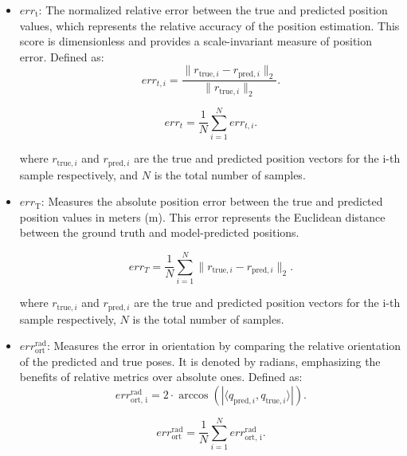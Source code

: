 \documentclass[a4paper,fleqn]{cas-sc}
\begin{document}
\begin{itemize}
	\item $err_{\text{t}}$: The normalized relative error between the true and predicted position values, which represents the relative accuracy of the position estimation. This score is dimensionless and provides a scale-invariant measure of position error. Defined as:
	\begin{equation}
		err_{t,i} = \frac{\| r_{\text{true},i} - r_{\text{pred},i} \|_2}{\| r_{\text{true},i} \|_2}.
	\end{equation}
	
	\begin{equation}
		err_t = \frac{1}{N} \sum\limits_{i=1}^{N} err_{t,i}.
	\end{equation}
	
	where $r_{\text{true},i}$ and $r_{\text{pred},i}$ are the true and predicted position vectors for the i-th sample respectively, and $N$ is the total number of samples.
	
	\item $err_{\text{T}}$: Measures the absolute position error between the true and predicted position values in meters (m). This error represents the Euclidean distance between the ground truth and model-predicted positions.
	
	\begin{equation}
		err_T = \frac{1}{N}\sum\limits_{i=1}^{N} \| r_{\text{true},i} - r_{\text{pred},i} \|_2.
	\end{equation}
	
	where $r_{\text{true},i}$ and $r_{\text{pred},i}$ are the true and predicted position vectors for the i-th sample respectively, $N$ is the total number of samples.
	
	\item $err_{\text{ort}}^{\text{rad}}$: Measures the error in orientation by comparing the relative orientation of the predicted and true poses.
	It is denoted by radians, emphasizing the benefits of relative metrics over absolute ones. Defined as:
	\begin{equation}
		err_{\text{ort, i}}^{\text{rad}} =  2 \cdot \arccos \left( \left| \langle q_{\text{pred},i}, q_{\text{true},i} \rangle \right| \right).
	\end{equation}
	
	\begin{equation}
		err_{\text{ort}}^{\text{rad}} = \frac{1}{N}\sum\limits_{i=1}^N err_{\text{ort, i}}^{\text{rad}}.
	\end{equation}
	

\end{itemize}
\end{document}
